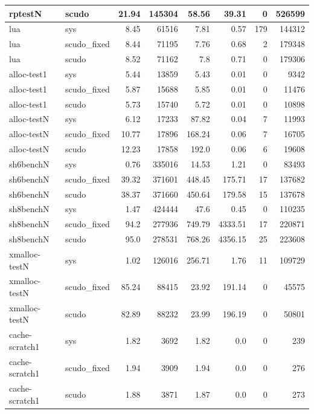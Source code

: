 \documentclass[a4paper,11pt,oneside]{report}
\begin{document}
\begin{longtable}[h]{l l r r r r r r}
  \midrule
  rptestN & scudo & 21.94 & 145304 & 58.56 & 39.31 & 0 & 526599 \\
  \midrule
  lua & sys & 8.45 & 61516 & 7.81 & 0.57 & 179 & 144312 \\
  \midrule
  lua & scudo\_fixed & 8.44 & 71195 & 7.76 & 0.68 & 2 & 179348 \\
  \midrule
  lua & scudo & 8.52 & 71162 & 7.8 & 0.71 & 0 & 179306 \\
  \midrule
  alloc-test1 & sys & 5.44 & 13859 & 5.43 & 0.01 & 0 & 9342 \\
  \midrule
  alloc-test1 & scudo\_fixed & 5.87 & 15688 & 5.85 & 0.01 & 0 & 11476 \\
  \midrule
  alloc-test1 & scudo & 5.73 & 15740 & 5.72 & 0.01 & 0 & 10898 \\
  \midrule
  alloc-testN & sys & 6.12 & 17233 & 87.82 & 0.04 & 7 & 11993 \\
  \midrule
  alloc-testN & scudo\_fixed & 10.77 & 17896 & 168.24 & 0.06 & 7 & 16705 \\
  \midrule
  alloc-testN & scudo & 12.23 & 17858 & 192.0 & 0.06 & 6 & 19608 \\
  \midrule
  sh6benchN & sys & 0.76 & 335016 & 14.53 & 1.21 & 0 & 83493 \\
  \midrule
  sh6benchN & scudo\_fixed & 39.32 & 371601 & 448.45 & 175.71 & 17 & 137682 \\
  \midrule
  sh6benchN & scudo & 38.37 & 371660 & 450.64 & 179.58 & 15 & 137678 \\
  \midrule
  sh8benchN & sys & 1.47 & 424444 & 47.6 & 0.45 & 0 & 110235 \\
  \midrule
  sh8benchN & scudo\_fixed & 94.2 & 277936 & 749.79 & 4333.51 & 17 & 220871 \\
  \midrule
  sh8benchN & scudo & 95.0 & 278531 & 768.26 & 4356.15 & 25 & 223608 \\
  \midrule
  xmalloc-testN & sys & 1.02 & 126016 & 256.71 & 1.76 & 11 & 109729 \\
  \midrule
  xmalloc-testN & scudo\_fixed & 85.24 & 88415 & 23.92 & 191.14 & 0 & 45575 \\
  \midrule
  xmalloc-testN & scudo & 82.89 & 88232 & 23.99 & 196.19 & 0 & 50801 \\
  \midrule
  cache-scratch1 & sys & 1.82 & 3692 & 1.82 & 0.0 & 0 & 239 \\
  \midrule
  cache-scratch1 & scudo\_fixed & 1.94 & 3909 & 1.94 & 0.0 & 0 & 276 \\
  \midrule
  cache-scratch1 & scudo & 1.88 & 3871 & 1.87 & 0.0 & 0 & 273 \\

\end{longtable}
\end{document}
